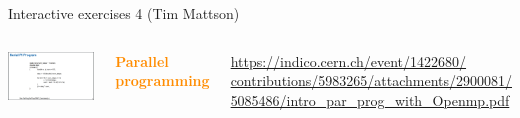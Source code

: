 \documentclass[aspectratio=169]{beamer}
\begin{document}
\begin{frame}{Interactive exercises 4 (Tim Mattson)}
\vspace{0.25 cm}
\large
\begin{columns}
\includegraphics[width=\linewidth]{PLOTS/parallel-processing.png}

\vspace{0.2 cm}

\textcolor{darkorange}{\bf Parallel programming}

\tiny
\vspace{0.2 cm}
\textcolor{blue}{\href{https://indico.cern.ch/event/1422680/contributions/5983265/attachments/2900081/5085486/intro_par_prog_with_Openmp.pdf}{https://indico.cern.ch/event/1422680/ \\
%
contributions/5983265/attachments/2900081/
%
5085486/intro\_par\_prog\_with\_Openmp.pdf}}

\small
\vspace{0.2 cm}

\vspace{0.2 cm}

\vspace{0.2 cm}

\vspace{0.2 cm}

\end{columns}
\end{frame}
\end{document}
